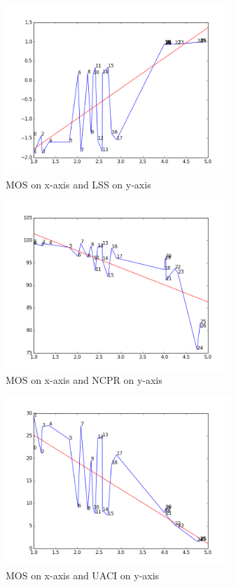 \documentclass{article}
\begin{document}
\begin{figure}[ht]
  \centering
  \includegraphics[width=8.5cm]{figures/mos_lss}
  \caption{MOS on x-axis and LSS on y-axis\label{fig:lss} }
\end{figure}
\begin{figure}[ht]
  \centering
  \includegraphics[width=8.5cm]{figures/mos_npcr}
  \caption{MOS on x-axis and NCPR on y-axis\label{fig:npcr} }
\end{figure}
\begin{figure}[ht]
  \centering
  \includegraphics[width=8.5cm]{figures/mos_uaci}
  \caption{MOS on x-axis and UACI on y-axis\label{fig:uaci} }
\end{figure}
\end{document}
